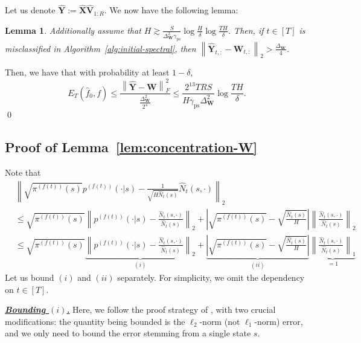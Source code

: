 \documentclass[twoside]{article}
\def\mV{{\bm{V}}}
\def\mW{{\bm{W}}}
\def\mX{{\bm{X}}}
\def\mY{{\bm{Y}}}
\theoremstyle{plain}
\newtheorem{lemma}{Lemma}[section]
\def\bignorm#1{\left\lVert #1 \right\rVert}
\def\bigabs#1{\left| #1 \right|}
\newcommand{\ps}{\mathrm{ps}}
\begin{document}
Let us denote $\widehat{\mY} := \widehat{\mX} \widehat{\mV}_{1:R}$.
We now have the following lemma:
\begin{lemma}
\label{lem:initial-misclassification}
    Additionally assume that $H \gtrsim \frac{S}{\Delta_\mW^2 \gamma_\ps} \log\frac{H}{\delta} \log\frac{TH}{\delta}$.
    Then, if $t \in [T]$ is misclassified in Algorithm~\ref{alg:initial-spectral}, then $\bignorm{\widehat{\mY}_{t,:} - \mW_{t,:}}_2 > \frac{\Delta_\mW}{4}$.
\end{lemma}
Then, we have that with probability at least $1 - \delta$,
\begin{equation*}
    E_T(\widehat{f}_0, f) \leq \frac{\bignorm{\widehat{\mY} - \mW}_F^2}{\frac{\Delta_\mW^2}{2^4}}
    \leq \frac{2^{13} T R S}{H \gamma_\ps \Delta_\mW^2} \log\frac{TH}{\delta}.
\end{equation*}
\qed



\subsection{Proof of Lemma~\ref{lem:concentration-W}}
Note that
\begin{align*}
	&\bignorm{\sqrt{\pi^{(f(t))}(s)} p^{(f(t))}(\cdot | s) - \frac{1}{\sqrt{H \widehat{N}_t(s)}} \widehat{N}_t(s, \cdot)}_2 \\
    &\leq \sqrt{\pi^{(f(t))}(s)} \bignorm{ p^{(f(t))}(\cdot | s) - \frac{\widehat{N}_t(s, \cdot)}{\widehat{N}_t(s)} }_2 + \bigabs{\sqrt{\pi^{(f(t))}(s)} - \sqrt{\frac{\widehat{N}_t(s)}{H}}} \bignorm{\frac{\widehat{N}_t(s, \cdot)}{\widehat{N}_t(s)}}_2 \\
	&\leq \sqrt{\pi^{(f(t))}(s)} \underbrace{\bignorm{ p^{(f(t))}(\cdot | s) - \frac{\widehat{N}_t(s, \cdot)}{\widehat{N}_t(s)} }_2}_{(i)} + \underbrace{\bigabs{\sqrt{\pi^{(f(t))}(s)} - \sqrt{\frac{\widehat{N}_t(s)}{H}}}}_{(ii)} \underbrace{\bignorm{\frac{\widehat{N}_t(s, \cdot)}{\widehat{N}_t(s)}}_1}_{= 1} 
\end{align*}
Let us bound $(i)$ and $(ii)$ separately.
For simplicity, we omit the dependency on $t \in [T]$.

\underline{\textbf{\textit{Bounding $(i)$.}}}
Here, we follow the proof strategy of \citet[Theorem 3.1]{wolfer2021markov}, with two crucial modifications: the quantity being bounded is the $\ell_2$-norm (not $\ell_1$-norm) error, and we only need to bound the error stemming from a single state $s$.
\end{document}
